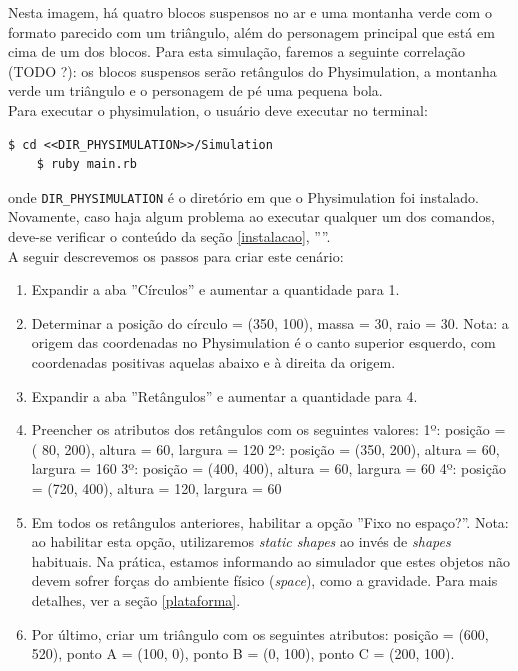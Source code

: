 Nesta imagem, há quatro blocos suspensos no ar e uma montanha verde com o formato parecido com um triângulo, além do personagem principal que está em cima de um dos blocos. Para esta simulação, faremos a seguinte correlação (TODO ?): os blocos suspensos serão retângulos do Physimulation, a montanha verde um triângulo e o personagem de pé uma pequena bola. \\

Para executar o physimulation, o usuário deve executar no terminal:

\begin{Verbatim}[fontsize=\footnotesize]
	$ cd <<DIR_PHYSIMULATION>>/Simulation
	$ ruby main.rb
\end{Verbatim}

onde {\tt\footnotesize DIR\_PHYSIMULATION} é o diretório em que o Physimulation foi instalado. Novamente, caso haja algum problema ao executar qualquer um dos comandos, deve-se verificar o conteúdo da seção \ref{instalacao}, ''''. \\

\newpage
A seguir descrevemos os passos para criar este cenário:

\begin{enumerate}
	\item Expandir a aba ''Círculos'' e aumentar a quantidade para 1.
	\item Determinar a posição do círculo = (350, 100), massa = 30, raio = 30. \newline 
		  Nota: a origem das coordenadas no Physimulation é o canto superior esquerdo, com coordenadas positivas aquelas abaixo e à direita da origem.
	\item Expandir a aba ''Retângulos'' e aumentar a quantidade para 4.
	\item Preencher os atributos dos retângulos com os seguintes valores:
		\subitem 1º: posição = ( 80, 200), altura =  60, largura = 120 
		\subitem 2º: posição = (350, 200), altura =  60, largura = 160
		\subitem 3º: posição = (400, 400), altura =  60, largura =  60
		\subitem 4º: posição = (720, 400), altura = 120, largura =  60

	\item Em todos os retângulos anteriores, habilitar a opção ''Fixo no espaço?''. \newline 
		  Nota: ao habilitar esta opção, utilizaremos \textit{static shapes} ao invés de \textit{shapes} habituais. Na prática, estamos informando ao simulador que estes objetos não devem sofrer forças do ambiente físico (\textit{space}), como a gravidade. Para mais detalhes, ver a seção \ref{plataforma}. 

	\item Por último, criar um triângulo com os seguintes atributos: posição = (600, 520), ponto A = (100, 0), ponto B = (0, 100), ponto C = (200, 100). \newline 

\end{enumerate}

